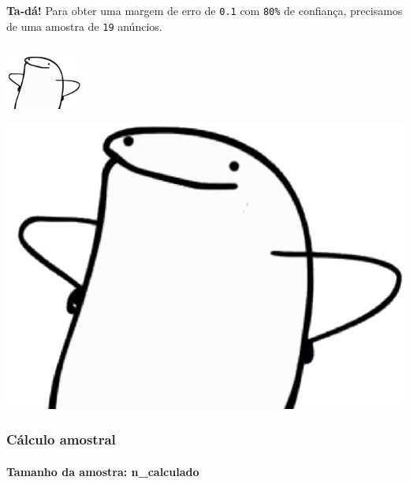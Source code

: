 \documentclass[
]{article}
\newenvironment{Shaded}{\begin{snugshade}}{\end{snugshade}}
\newcommand{\DecValTok}[1]{\textcolor[rgb]{0.00,0.00,0.81}{#1}}
\newcommand{\FloatTok}[1]{\textcolor[rgb]{0.00,0.00,0.81}{#1}}
\newcommand{\FunctionTok}[1]{\textcolor[rgb]{0.13,0.29,0.53}{\textbf{#1}}}
\newcommand{\NormalTok}[1]{#1}
\newcommand{\OtherTok}[1]{\textcolor[rgb]{0.56,0.35,0.01}{#1}}
\newcommand{\SpecialCharTok}[1]{\textcolor[rgb]{0.81,0.36,0.00}{\textbf{#1}}}
\newcommand{\StringTok}[1]{\textcolor[rgb]{0.31,0.60,0.02}{#1}}
\let\oldincludegraphics\includegraphics
\renewcommand{\includegraphics}[2][]{ \ifthenelse{ \equal{#1}{} } { \oldincludegraphics[width=2.5cm,height=2.5cm,keepaspectratio=true]{#2} } { \oldincludegraphics[#1]{#2} } }
\begin{document}
\textbf{Ta-dá!} Para obter uma margem de erro de \texttt{0.1} com
\texttt{80\%} de confiança, precisamos de uma amostra de \texttt{19}
anúncios.

\includegraphics{./images/proud.png}

\subsubsection{Cálculo amostral}\label{cuxe1lculo-amostral}

\paragraph{Tamanho da amostra:
n\_calculado}\label{tamanho-da-amostra-n_calculado}

\begin{Shaded}
\end{Shaded}
\end{document}
